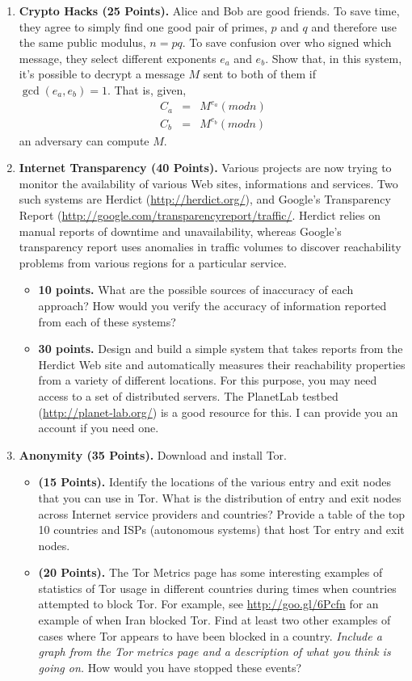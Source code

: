\documentclass[11pt]{article}
\begin{document}
\begin{enumerate}
\item {\bf Crypto Hacks (25 Points).} Alice and Bob are good friends.
  To save time, they agree to simply find one good pair of primes, $p$
  and $q$ and therefore use the same public modulus, $n = pq$.  To save
  confusion over who signed which message, they select different
  exponents $e_a$ and $e_b$.  Show that, in this system, it's possible
  to decrypt a message $M$ sent to both of them if $\gcd(e_a, e_b) =
  1$.  That is, given, 
\begin{eqnarray*}
C_a &=& M^{e_a} (mod n) \\
C_b &=& M^{e_b} (mod n) 
\end{eqnarray*}
an adversary can compute $M$.

\item {\bf Internet Transparency (40 Points).}  Various projects are now
  trying to monitor the availability of various Web sites, informations
  and services.  Two such systems are Herdict
  (\url{http://herdict.org/}), and Google's Transparency Report
  (\url{http://google.com/transparencyreport/traffic/}.  Herdict relies
  on manual reports of downtime and unavailability, whereas Google's
  transparency report uses anomalies in traffic volumes to discover
  reachability problems from various regions for a particular service.
\begin{itemize}
\item {\bf 10 points.} What are the possible sources of inaccuracy of
  each approach? How would you verify the accuracy of information
  reported from  each of these systems?
\item {\bf 30 points.} Design and build a simple system that takes reports from
  the Herdict Web site and automatically measures their reachability
  properties from a variety of different locations.  For this purpose,
  you may need access to a set of distributed servers.  The PlanetLab
  testbed (\url{http://planet-lab.org/}) is a good resource for this.  I
  can provide you an account if you need one.
\end{itemize}

\item {\bf Anonymity (35 Points).} Download and install Tor.  
\begin{itemize}
\item {\bf (15 Points).} Identify the locations of the various entry and
  exit nodes that you can use in Tor.  What is the distribution of entry
  and exit nodes across Internet service providers and countries?
  Provide a table of the top 10 countries and ISPs (autonomous systems)
  that host Tor entry and exit nodes.
\item {\bf (20 Points).} The Tor Metrics page has some interesting
  examples of statistics of Tor usage in different countries during
  times when countries attempted to block Tor.  For example, see
  \url{http://goo.gl/6Pcfn} for an example of when Iran blocked Tor.
  Find at least two other examples of cases where Tor appears to have
  been blocked in a country.  {\em Include a graph from the Tor metrics
    page and a description of what you think is going on.}  How would
  you have stopped these events?
\end{itemize}

\end{enumerate}
\end{document}
